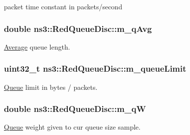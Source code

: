 packet time constant in packets/second 

\subsubsection[{\texorpdfstring{m\+\_\+q\+Avg}{m_qAvg}}]{\setlength{\rightskip}{0pt plus 5cm}double ns3\+::\+Red\+Queue\+Disc\+::m\+\_\+q\+Avg\hspace{0.3cm}{\ttfamily [private]}}\hypertarget{classns3_1_1RedQueueDisc_ad51f583bf9d9964833fd8a710a40e247}{}\label{classns3_1_1RedQueueDisc_ad51f583bf9d9964833fd8a710a40e247}


\hyperlink{classns3_1_1Average}{Average} queue length. 

\subsubsection[{\texorpdfstring{m\+\_\+queue\+Limit}{m_queueLimit}}]{\setlength{\rightskip}{0pt plus 5cm}uint32\+\_\+t ns3\+::\+Red\+Queue\+Disc\+::m\+\_\+queue\+Limit\hspace{0.3cm}{\ttfamily [private]}}\hypertarget{classns3_1_1RedQueueDisc_a421aec8e4b8cca06d16bfc5f8def2623}{}\label{classns3_1_1RedQueueDisc_a421aec8e4b8cca06d16bfc5f8def2623}


\hyperlink{classns3_1_1Queue}{Queue} limit in bytes / packets. 

\subsubsection[{\texorpdfstring{m\+\_\+qW}{m_qW}}]{\setlength{\rightskip}{0pt plus 5cm}double ns3\+::\+Red\+Queue\+Disc\+::m\+\_\+qW\hspace{0.3cm}{\ttfamily [private]}}\hypertarget{classns3_1_1RedQueueDisc_aed406d18723a07fe991497553abed6da}{}\label{classns3_1_1RedQueueDisc_aed406d18723a07fe991497553abed6da}


\hyperlink{classns3_1_1Queue}{Queue} weight given to cur queue size sample. 


